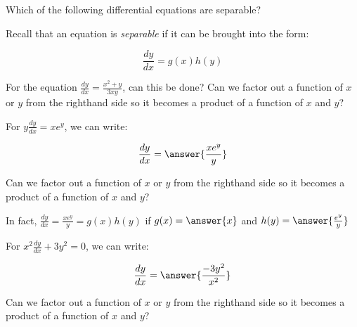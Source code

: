 \documentclass{ximera}
\author{Jim Talamo}
\begin{document}
\begin{exercise}

Which of the following differential equations are separable?

\begin{multipleChoice}
\end{multipleChoice}

\begin{hint}
Recall that an equation is \emph{separable} if it can be brought into the form:

\[
\frac{dy}{dx} = g(x)h(y) 
\]

\begin{question}
For the equation $\frac{dy}{dx} = \frac{x^2+y}{3xy}$, can this be done?  Can we factor out a function of $x$ or $y$ from the righthand side so it becomes a product of a function of $x$ and $y$?

\begin{multipleChoice}
\end{multipleChoice}
\end{question}
\begin{question}
For $y\frac{dy}{dx} = xe^{y}$, we can write:

\[
\frac{dy}{dx} = \answer{\frac{xe^y}{y}}
\]

Can we factor out a function of $x$ or $y$ from the righthand side so it becomes a product of a function of $x$ and $y$?
\begin{multipleChoice}
\end{multipleChoice}

In fact, $\frac{dy}{dx} = \frac{xe^y}{y} = g(x)h(y)$ if $g(x) = \answer{x}$ and $h(y) = \answer{\frac{e^y}{y}}$
\end{question}
\begin{question}
For $x^2\frac{dy}{dx} + 3y^2 = 0$, we can write:

\[
\frac{dy}{dx} = \answer{\frac{-3y^2}{x^2}}
\]

Can we factor out a function of $x$ or $y$ from the righthand side so it becomes a product of a function of $x$ and $y$?
\begin{multipleChoice}
\end{multipleChoice}


\end{question}
\end{hint}
\end{exercise}
\end{document}
